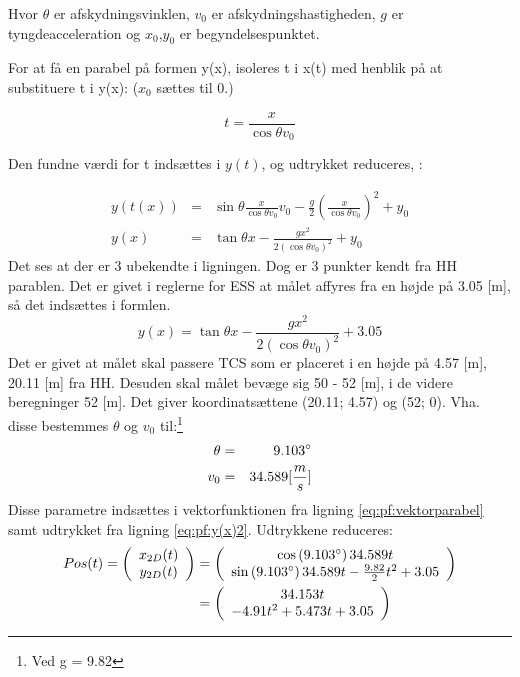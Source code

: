 Hvor $\theta$ er afskydningsvinklen, $v_0$ er afskydningshastigheden, $g$ er tyngdeacceleration og $x_0$,$y_0$ er begyndelsespunktet. 

For at få en parabel på formen y(x), isoleres t i x(t) med henblik på at substituere t i y(x): ($x_0$ sættes til 0.)

\begin{equation}
t = \frac{x}{\cos \theta v_0}
\label{eq:pf:x(t)}
\end{equation}

Den fundne værdi for t indsættes i $y(t)$, og udtrykket reduceres, \citep[Side. 67]{fund_of_physics}: 

\begin{eqnarray}
y(t(x)) &=& \sin \theta \frac{x}{\cos \theta v_0} v_0 - \frac{g}{2} \left(\frac{x}{\cos \theta v_0}\right)^2 + y_0 \\
y(x) &=& \tan \theta x - \frac{gx^2}{2(\cos \theta v_0)^2} + y_0
\label{eq:pf:y(x(t))}
\end{eqnarray}
Det ses at der er 3 ubekendte i ligningen. Dog er 3 punkter kendt fra HH parablen. Det er givet i reglerne for ESS at målet affyres fra en højde på 3.05 [m], så det indsættes i formlen. 
\begin{equation}
y(x) = \tan \theta x - \frac{gx^2}{2(\cos \theta v_0)^2} + 3.05
\label{eq:pf:y(x)2}
\end{equation}
Det er givet at målet skal passere TCS som er placeret i en højde på 4.57 [m], 20.11 [m] fra HH. 
Desuden skal målet bevæge sig 50 - 52 [m], i de videre beregninger 52 [m]. Det giver koordinatsættene (20.11; 4.57) og (52; 0). Vha. disse bestemmes $\theta$ og $v_0$ til:\footnote{Ved g = 9.82}
\begin{eqnarray}
\theta &=& 9.103 \degree \\
v_0 &=& 34.589 [\frac{m}{s}]
\end{eqnarray}
Disse parametre indsættes i vektorfunktionen fra ligning \ref{eq:pf:vektorparabel} samt udtrykket fra ligning \ref{eq:pf:y(x)2}. Udtrykkene reduceres: 
\begin{align}
\begin{split}
	Pos(t) = \left( \begin{array}{c}
	x_{2D}(t) \\
	y_{2D}(t)
	\end{array}
	\right)
	&= \left( \begin{array}{c}
	\cos \left(9.103 \degree \right) 34.589 t \\
	\sin \left(9.103 \degree \right) 34.589 t - \frac{9.82}{2} t^2 + 3.05
	\end{array}
	\right) \\
	&= \left( \begin{array}{c}
	34.153 t \\
	- 4.91 t^2 + 5.473 t + 3.05
	\end{array}
	\right)
\label{eq:pf:vektorparabel2}
\end{split}
\end{align}

